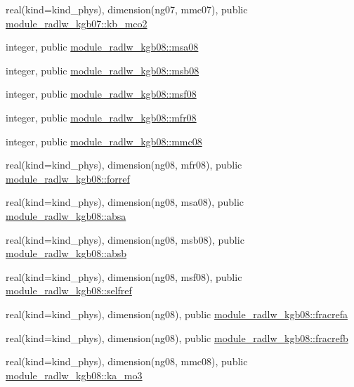 \begin{DoxyCompactItemize}
\item 
real(kind=kind\+\_\+phys), dimension(ng07, mmc07), public \hyperlink{namespacemodule__radlw__kgb07_a2dcfbe76332d559cda48c7ba065ab349}{module\+\_\+radlw\+\_\+kgb07\+::kb\+\_\+mco2}
\item 
integer, public \hyperlink{namespacemodule__radlw__kgb08_a74e4bd8f4b00d0ff6bae1a39d9bddd3b}{module\+\_\+radlw\+\_\+kgb08\+::msa08}
\item 
integer, public \hyperlink{namespacemodule__radlw__kgb08_a3dd391fcce47d3aca3512bbfd946807b}{module\+\_\+radlw\+\_\+kgb08\+::msb08}
\item 
integer, public \hyperlink{namespacemodule__radlw__kgb08_a7db22d5a0ece1b1f10cbf64ae1181a09}{module\+\_\+radlw\+\_\+kgb08\+::msf08}
\item 
integer, public \hyperlink{namespacemodule__radlw__kgb08_abfaf0cad62f8ae42564f8127198d48f0}{module\+\_\+radlw\+\_\+kgb08\+::mfr08}
\item 
integer, public \hyperlink{namespacemodule__radlw__kgb08_a9e3bfc1880221c18fa07817eb62bcc47}{module\+\_\+radlw\+\_\+kgb08\+::mmc08}
\item 
real(kind=kind\+\_\+phys), dimension(ng08, mfr08), public \hyperlink{namespacemodule__radlw__kgb08_a8427ec5170f6a61a008a8580be6fe5ec}{module\+\_\+radlw\+\_\+kgb08\+::forref}
\item 
real(kind=kind\+\_\+phys), dimension(ng08, msa08), public \hyperlink{namespacemodule__radlw__kgb08_aba1018958264bbc6fbf7f190fea91fa5}{module\+\_\+radlw\+\_\+kgb08\+::absa}
\item 
real(kind=kind\+\_\+phys), dimension(ng08, msb08), public \hyperlink{namespacemodule__radlw__kgb08_a23d4352fcafb0394d723e2f080a84ece}{module\+\_\+radlw\+\_\+kgb08\+::absb}
\item 
real(kind=kind\+\_\+phys), dimension(ng08, msf08), public \hyperlink{namespacemodule__radlw__kgb08_a2c38561d26f86f7ae515b433843c4e5d}{module\+\_\+radlw\+\_\+kgb08\+::selfref}
\item 
real(kind=kind\+\_\+phys), dimension(ng08), public \hyperlink{namespacemodule__radlw__kgb08_ad1a59ffb362cd72537df9c1916c07621}{module\+\_\+radlw\+\_\+kgb08\+::fracrefa}
\item 
real(kind=kind\+\_\+phys), dimension(ng08), public \hyperlink{namespacemodule__radlw__kgb08_a0ae7e4c01034a2b95c03b041537b962e}{module\+\_\+radlw\+\_\+kgb08\+::fracrefb}
\item 
real(kind=kind\+\_\+phys), dimension(ng08, mmc08), public \hyperlink{namespacemodule__radlw__kgb08_a7dec65e880c278f44419c1ae01490eae}{module\+\_\+radlw\+\_\+kgb08\+::ka\+\_\+mo3}

\end{DoxyCompactItemize}
